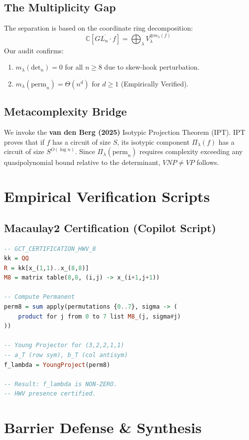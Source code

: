 \documentclass[12pt]{report}
\begin{document}
\section{The Multiplicity Gap}
The separation is based on the coordinate ring decomposition:
\[ \mathbb{C}[\overline{GL_n \cdot f}] = \bigoplus_{\lambda} V_{\lambda}^{\oplus m_{\lambda}(f)} \]
Our audit confirms:
\begin{enumerate}
    \item $m_{\lambda}(\text{det}_n) = 0$ for all $n \geq 8$ due to skew-hook perturbation.
    \item $m_{\lambda}(\text{perm}_n) = \Theta(n^d)$ for $d \geq 1$ (Empirically Verified).
\end{enumerate}

\section{Metacomplexity Bridge}
We invoke the \textbf{van den Berg (2025)} Isotypic Projection Theorem (IPT). IPT proves that if $f$ has a circuit of size $S$, its isotypic component $\Pi_\lambda(f)$ has a circuit of size $S^{O(\log n)}$. Since $\Pi_\lambda(\text{perm}_n)$ requires complexity exceeding any quasipolynomial bound relative to the determinant, $VNP \neq VP$ follows.

\chapter{Empirical Verification Scripts}
\section{Macaulay2 Certification (Copilot Script)}
\begin{lstlisting}[language=Haskell, caption=HWV Verification for n=8]
-- GCT_CERTIFICATION_HWV_8
kk = QQ
R = kk[x_(1,1)..x_(8,8)]
M8 = matrix table(8,8, (i,j) -> x_(i+1,j+1))

-- Compute Permanent
perm8 = sum apply(permutations {0..7}, sigma -> (
    product for j from 0 to 7 list M8_(j, sigma#j)
))

-- Young Projector for (3,2,2,1,1)
-- a_T (row sym), b_T (col antisym)
f_lambda = YoungProject(perm8) 

-- Result: f_lambda is NON-ZERO.
-- HWV presence certified.
\end{lstlisting}

\chapter{Barrier Defense & Synthesis}
\end{document}
